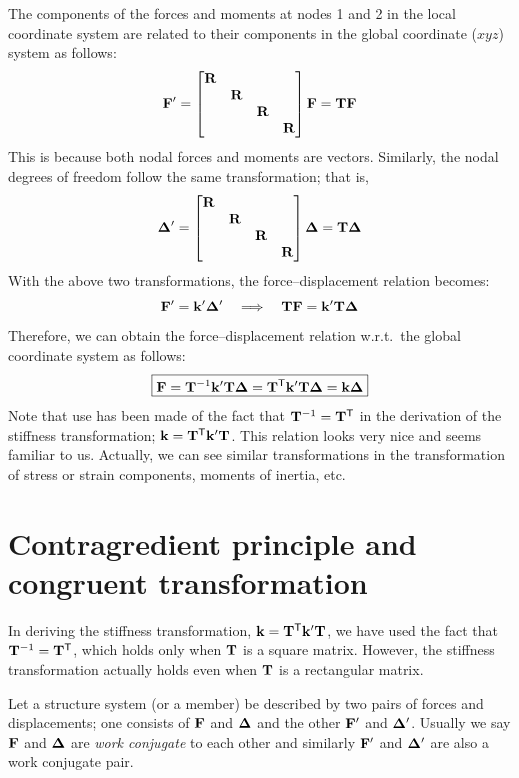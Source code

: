 The components of the forces and moments at nodes 1 and 2 in the local coordinate system are related to their components in the global coordinate ($xyz$) system as follows:
\begin{equation}
  \mathbf{F}' = \begin{bmatrix}\mathbf{R} & & & \\ & \mathbf{R} & & \\ & & \mathbf{R} & \\ & & & \mathbf{R}\end{bmatrix}\mathbf{F} = \mathbf{T}\mathbf{F}
\end{equation}
This is because both nodal forces and moments are vectors. Similarly, the nodal degrees of freedom follow the same transformation; that is,
\begin{equation}
  \bm{\Delta}' = \begin{bmatrix}\mathbf{R} & & & \\ & \mathbf{R} & & \\ & & \mathbf{R} & \\ & & & \mathbf{R}\end{bmatrix}\bm{\Delta} = \mathbf{T}\bm{\Delta}
\end{equation}
With the above two transformations, the force--displacement relation becomes:
\begin{equation}
  \mathbf{F}' = \mathbf{k}'\bm{\Delta}' \quad\Longrightarrow\quad \mathbf{T}\mathbf{F} = \mathbf{k}'\mathbf{T}\bm{\Delta}
\end{equation}
Therefore, we can obtain the force--displacement relation w.r.t.\ the global coordinate system as follows:
\begin{equation}
  \boxed{\mathbf{F} = \mathbf{T}^{-1}\mathbf{k}'\mathbf{T}\bm{\Delta} = \mathbf{T}^{\mathsf{T}}\mathbf{k}'\mathbf{T}\bm{\Delta} = \mathbf{k}\bm{\Delta}}
\end{equation}
Note that use has been made of the fact that $\mathbf{T}^{-1} = \mathbf{T}^{\mathsf{T}}$ in the derivation of the stiffness transformation; $\mathbf{k} = \mathbf{T}^{\mathsf{T}}\mathbf{k}'\mathbf{T}$. This relation looks very nice and seems familiar to us. Actually, we can see similar transformations in the transformation of stress or strain components, moments of inertia, etc.

\section{Contragredient principle and congruent transformation}
In deriving the stiffness transformation, $\mathbf{k} = \mathbf{T}^{\mathsf{T}}\mathbf{k}'\mathbf{T}$, we have used the fact that $\mathbf{T}^{-1} = \mathbf{T}^{\mathsf{T}}$, which holds only when $\mathbf{T}$ is a square matrix. However, the stiffness transformation actually holds even when $\mathbf{T}$ is a rectangular matrix.

Let a structure system (or a member) be described by two pairs of forces and displacements; one consists of $\mathbf{F}$ and $\bm{\Delta}$ and the other $\mathbf{F}'$ and $\bm{\Delta}'$. Usually we say $\mathbf{F}$ and $\bm{\Delta}$ are \emph{work conjugate} to each other and similarly $\mathbf{F}'$ and $\bm{\Delta}'$ are also a work conjugate pair.

